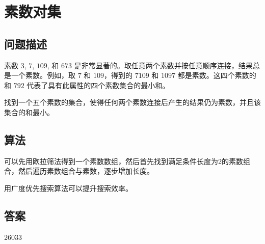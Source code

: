 \section{素数对集}\label{sec:problem60}
\subsection{问题描述}
\begin{tcolorbox}
素数 $3$, $7$, $109$, 和 $673$ 是非常显著的。取任意两个素数并按任意顺序连接，结果总是一个素数。例如，取 $7$ 和 $109$，得到的 $7109$ 和 $1097$ 都是素数。这四个素数的和 $792$ 代表了具有此属性的四个素数集合的最小和。

找到一个五个素数的集合，使得任何两个素数连接后产生的结果仍为素数，并且该集合的和最小。
\end{tcolorbox}

\subsection{算法}
可以先用欧拉筛法得到一个素数数组，然后首先找到满足条件长度为2的素数组合，然后遍历素数组合与素数，逐步增加长度。

用广度优先搜索算法可以提升搜索效率。
\subsection{答案}
26033
